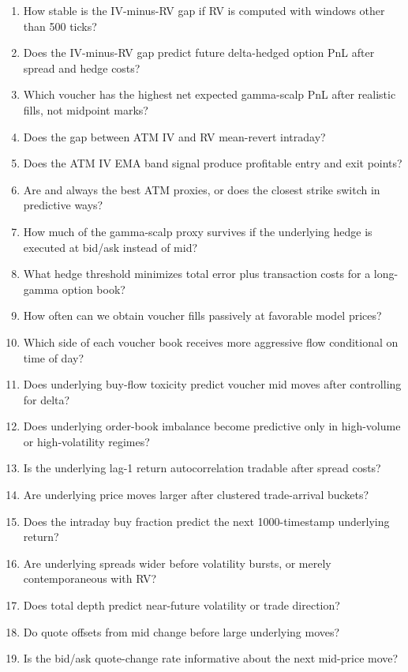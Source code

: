 \documentclass[11pt]{article}
\newcommand{\code}[1]{\texttt{\detokenize{#1}}}
\begin{document}
\begin{enumerate}[label=Q\arabic*.,leftmargin=*]
  \item How stable is the IV-minus-RV gap if RV is computed with windows other than 500 ticks?
  \item Does the IV-minus-RV gap predict future delta-hedged option PnL after spread and hedge costs?
  \item Which voucher has the highest net expected gamma-scalp PnL after realistic fills, not midpoint marks?
  \item Does the gap between ATM IV and RV mean-revert intraday?
  \item Does the ATM IV EMA band signal produce profitable entry and exit points?
  \item Are \code{VEV_5200} and \code{VEV_5300} always the best ATM proxies, or does the closest strike switch in predictive ways?
  \item How much of the gamma-scalp proxy survives if the underlying hedge is executed at bid/ask instead of mid?
  \item What hedge threshold minimizes total error plus transaction costs for a long-gamma option book?
  \item How often can we obtain voucher fills passively at favorable model prices?
  \item Which side of each voucher book receives more aggressive flow conditional on time of day?
  \item Does underlying buy-flow toxicity predict voucher mid moves after controlling for delta?
  \item Does underlying order-book imbalance become predictive only in high-volume or high-volatility regimes?
  \item Is the underlying lag-1 return autocorrelation tradable after spread costs?
  \item Are underlying price moves larger after clustered trade-arrival buckets?
  \item Does the intraday buy fraction predict the next 1000-timestamp underlying return?
  \item Are underlying spreads wider before volatility bursts, or merely contemporaneous with RV?
  \item Does total depth predict near-future volatility or trade direction?
  \item Do quote offsets from mid change before large underlying moves?
  \item Is the bid/ask quote-change rate informative about the next mid-price move?

\end{enumerate}
\end{document}
